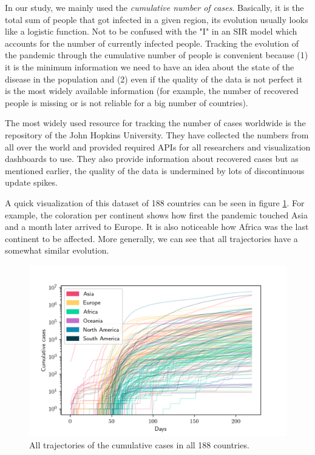 \documentclass[12pt, letterpaper]{article}
\begin{document}
In our study, we mainly used the {\em cumulative number of cases}. 
Basically, it is the total sum of people that got infected in a given region, its evolution usually looks like a logistic function. 
Not to be confused with the "I" in an SIR model which accounts for the number of currently infected people. 
Tracking the evolution of the pandemic through the cumulative number of people is convenient because (1) it is the minimum information we need to have an idea about the state of the disease in the population and (2) even if the quality of the data is not perfect it is the most widely available information (for example, the number of recovered people is missing or is not reliable for a big number of countries).

The most widely used resource for tracking the number of cases worldwide is the repository of the John Hopkins University. They have collected the numbers from all over the world and provided required APIs for all researchers and visualization dashboards to use. They also provide information about recovered cases but as mentioned earlier, the quality of the data is undermined by lots of discontinuous update spikes.

A quick visualization of this dataset of 188 countries can be seen in figure \ref{fig:all_trajectories}. 
For example, the coloration per continent shows how first the pandemic touched Asia and a month later arrived to Europe. 
It is also noticeable how Africa was the last continent to be affected.
More generally, we can see that all trajectories have a somewhat similar evolution.

\begin{figure}[h]
\centering
\includegraphics[scale=0.8]{all_trajectories.png}
\caption{All trajectories of the cumulative cases in all 188 countries.}
\label{fig:all_trajectories}
\end{figure}
\end{document}
